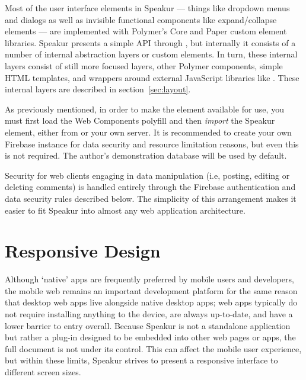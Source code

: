 Most of the user interface elements in Speakur 
--- things like dropdown menus and dialogs as well as invisible functional components like expand/collapse elements  
--- are implemented with Polymer's Core and Paper custom element libraries.
Speakur presents a simple API through ,
but internally it consists of a number of internal abstraction layers or custom elements.
In turn, these internal layers consist of still more focused layers, other Polymer components, 
simple HTML templates, 
and wrappers around external JavaScript libraries 
like .
These internal layers are described in section~\ref{sec:layout}.

As previously mentioned, in order to make the 
 element available for use, 
you must first load the Web Components polyfill and then \textit{import} the Speakur element, 
either from  or your own server.
It is recommended to create your own Firebase instance for data security and resource limitation reasons, but even this is not required. 
The author's demonstration database will be used by default.

Security for web clients engaging in data manipulation 
(i.e, posting, editing or deleting comments) 
is handled entirely through the Firebase authentication 
and data security rules described below.
The simplicity of this arrangement makes it easier to fit Speakur into almost any web application architecture.

\section{Responsive Design}
Although `native' apps are frequently preferred by mobile users and developers, 
the mobile web remains an important development platform for the same reason that 
desktop web apps live alongside native desktop apps; 
web apps typically do not require installing anything to the device, are always up-to-date, and have a lower barrier to entry overall.
Because Speakur is not a standalone application but rather a plug-in designed to be embedded into other web pages or apps, 
the full document is not under its control.
This can affect the mobile user experience,
but within these limits, Speakur strives to present a responsive interface to different screen sizes.

